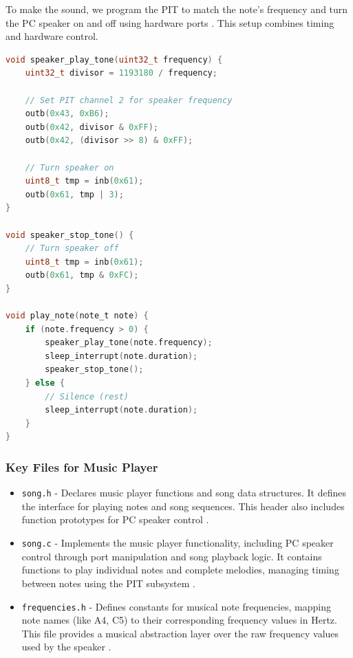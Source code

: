 \documentclass[a4paper,11pt]{article}
\begin{document}
To make the sound, we program the PIT to match the note's frequency and turn the PC speaker on and off using hardware ports \cite{OSDev_PC_Speaker, OSDev_PIT}. This setup combines timing and hardware control.



\begin{lstlisting}[language=c]
void speaker_play_tone(uint32_t frequency) {
    uint32_t divisor = 1193180 / frequency;
    
    // Set PIT channel 2 for speaker frequency
    outb(0x43, 0xB6);
    outb(0x42, divisor & 0xFF);
    outb(0x42, (divisor >> 8) & 0xFF);
    
    // Turn speaker on
    uint8_t tmp = inb(0x61);
    outb(0x61, tmp | 3);
}

void speaker_stop_tone() {
    // Turn speaker off
    uint8_t tmp = inb(0x61);
    outb(0x61, tmp & 0xFC);
}

void play_note(note_t note) {
    if (note.frequency > 0) {
        speaker_play_tone(note.frequency);
        sleep_interrupt(note.duration);
        speaker_stop_tone();
    } else {
        // Silence (rest)
        sleep_interrupt(note.duration);
    }
}
\end{lstlisting}

\subsubsection{Key Files for Music Player}
\begin{itemize}
    \item \texttt{song.h} - Declares music player functions and song data structures. It defines the interface for playing notes and song sequences. This header also includes function prototypes for PC speaker control \cite{OSDev_PC_Speaker}.
    
    \item \texttt{song.c} - Implements the music player functionality, including PC speaker control through port manipulation and song playback logic. It contains functions to play individual notes and complete melodies, managing timing between notes using the PIT subsystem \cite{OSDev_PIT} \cite{OSDev_PC_Speaker}.
    
    \item \texttt{frequencies.h} - Defines constants for musical note frequencies, mapping note names (like A4, C5) to their corresponding frequency values in Hertz. This file provides a musical abstraction layer over the raw frequency values used by the speaker \cite{Note_Frequencies}.
\end{itemize}
\end{document}

